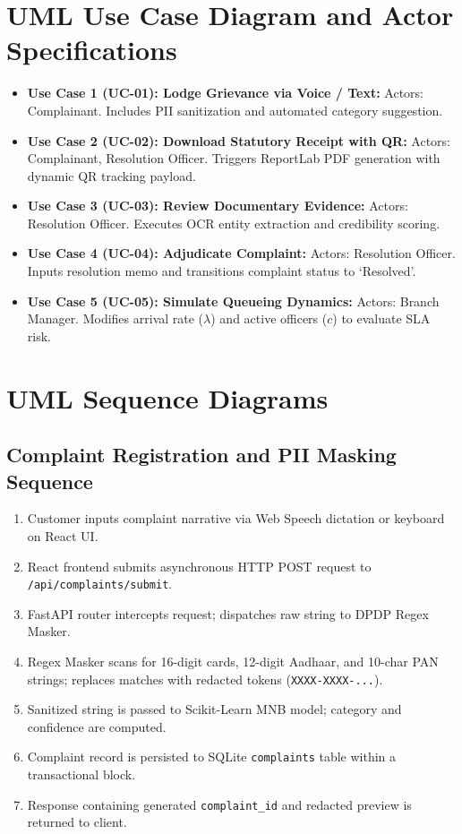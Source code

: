\section{UML Use Case Diagram and Actor Specifications}
\begin{itemize}
    \item \textbf{Use Case 1 (UC-01): Lodge Grievance via Voice / Text:} Actors: Complainant. Includes PII sanitization and automated category suggestion.
    \item \textbf{Use Case 2 (UC-02): Download Statutory Receipt with QR:} Actors: Complainant, Resolution Officer. Triggers ReportLab PDF generation with dynamic QR tracking payload.
    \item \textbf{Use Case 3 (UC-03): Review Documentary Evidence:} Actors: Resolution Officer. Executes OCR entity extraction and credibility scoring.
    \item \textbf{Use Case 4 (UC-04): Adjudicate Complaint:} Actors: Resolution Officer. Inputs resolution memo and transitions complaint status to `Resolved'.
    \item \textbf{Use Case 5 (UC-05): Simulate Queueing Dynamics:} Actors: Branch Manager. Modifies arrival rate ($\lambda$) and active officers ($c$) to evaluate SLA risk.
\end{itemize}

\section{UML Sequence Diagrams}
\subsection{Complaint Registration and PII Masking Sequence}
\begin{enumerate}
    \item Customer inputs complaint narrative via Web Speech dictation or keyboard on React UI.
    \item React frontend submits asynchronous HTTP POST request to \texttt{/api/complaints/submit}.
    \item FastAPI router intercepts request; dispatches raw string to DPDP Regex Masker.
    \item Regex Masker scans for 16-digit cards, 12-digit Aadhaar, and 10-char PAN strings; replaces matches with redacted tokens (\texttt{XXXX-XXXX-...}).
    \item Sanitized string is passed to Scikit-Learn MNB model; category and confidence are computed.
    \item Complaint record is persisted to SQLite \texttt{complaints} table within a transactional block.
    \item Response containing generated \texttt{complaint\_id} and redacted preview is returned to client.
\end{enumerate}

